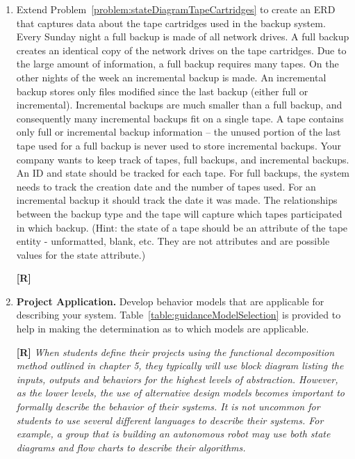 \begin{enumerate}
\item
  Extend Problem~\ref{problem:stateDiagramTapeCartridges}
  to create an ERD that captures data about the tape
  cartridges used in the backup system. Every Sunday night a full backup
  is made of all network drives. A full backup creates an identical copy
  of the network drives on the tape cartridges. Due to the large amount
  of information, a full backup requires many tapes. On the other nights
  of the week an incremental backup is made. An incremental backup
  stores only files modified since the last backup (either full or
  incremental). Incremental backups are much smaller than a full backup,
  and consequently many incremental backups fit on a single tape. A tape
  contains only full or incremental backup information -- the unused
  portion of the last tape used for a full backup is never used to store
  incremental backups. Your company wants to keep track of tapes, full
  backups, and incremental backups. An ID and state should be tracked
  for each tape. For full backups, the system needs to track the
  creation date and the number of tapes used. For an incremental backup
  it should track the date it was made. The relationships between the
  backup type and the tape will capture which tapes participated in
  which backup. (Hint: the state of a tape should be an attribute of the
  tape entity - unformatted, blank, etc. They are not attributes and are
  possible values for the state attribute.)

  \begin{onlysolution}
    \textbf{[R]}
    \itshape
  \end{onlysolution}

\item
  \textbf{Project Application.} Develop behavior models that are
  applicable for describing your system. 
  Table~\ref{table:guidanceModelSelection} is provided to help
  in making the determination as to which models are applicable.

  \begin{onlysolution}
    \textbf{[R]}
    \itshape
    When students define their projects using the functional decomposition 
    method outlined in chapter 5, they typically will use block diagram 
    listing the inputs, outputs and behaviors for the highest levels of 
    abstraction. However, as the lower levels, the use of alternative design 
    models becomes important to formally describe the behavior of their systems. 
    It is not uncommon for students to use several different languages to 
    describe their systems. For example, a group that is building an autonomous 
    robot may use both state diagrams and flow charts to describe their algorithms.
  \end{onlysolution}

\end{enumerate}
